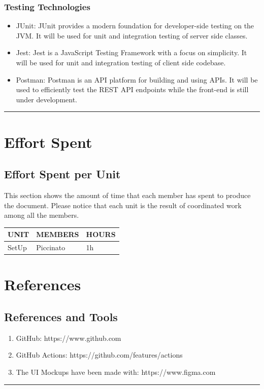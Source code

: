 \documentclass{Configuration_Files/Template}
\begin{document}
\subsection{Testing Technologies}
\begin{itemize}
    \item \textcolor{bluepoli}{JUnit}: JUnit provides a modern foundation for developer-side testing on the JVM. It will be used for unit and integration testing of server side classes.
    \item \textcolor{bluepoli}{Jest}: Jest is a JavaScript Testing Framework with a focus on simplicity. It will be used for unit and integration testing of client side codebase.
    \item \textcolor{bluepoli}{Postman}: Postman is an API platform for building and using APIs. It will be used to efficiently test the REST API endpoints while the front-end is still under development.
\end{itemize}

{\color{bluepoli}\rule{\linewidth}{0.1pt}}

\chapter{Effort Spent}

\section{Effort Spent per Unit}

This section shows the amount of time that each member has spent to produce the document. Please notice that each unit is the result of coordinated work among all the members.

\begin{table}[h]
\centering
\begin{tabularx}{\textwidth}{| X | X | X |}
\hline
\textbf{UNIT} & \textbf{MEMBERS} & \textbf{HOURS} \\ [1ex]
\hline
SetUp & Piccinato & 1h \\ [1ex]
\hline
\end{tabularx}
\end{table}

\chapter{References}

\section{References and Tools}

\begin{enumerate}
    \item GitHub: https://www.github.com
    \item GitHub Actions: https://github.com/features/actions
    \item The UI Mockups have been made with: https://www.figma.com
\end{enumerate}

{\color{bluepoli}\rule{\linewidth}{0.1pt}}
\end{document}
